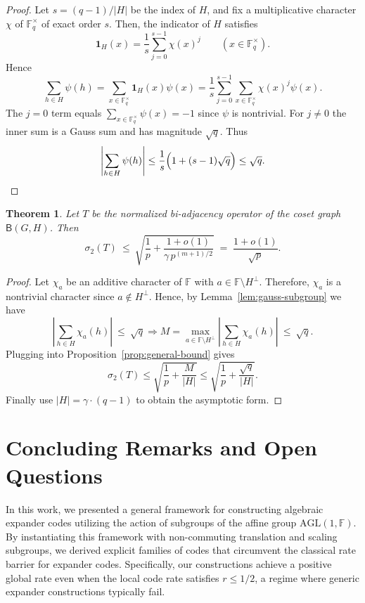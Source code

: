 \documentclass[11pt]{article}
\theoremstyle{plain}
\newtheorem{theorem}{Theorem}[section]
\theoremstyle{definition}
\begin{document}
\begin{proof}
Let   $s=(q-1)/|H|$ be the index of $H$, and fix a multiplicative character $\chi$ of $\mathbb F_q^\times$ of exact order $s$.
Then, the indicator of $H$ satisfies
\[
\mathbf{1}_H(x) = \frac1s\sum_{j=0}^{s-1}\chi(x)^j \qquad (x\in\mathbb F_q^\times).
\]
Hence
\[
\sum_{h\in H}\psi(h)
=\sum_{x\in\mathbb F_q^\times}\mathbf{1}_H(x)\psi(x)
=\frac1s\sum_{j=0}^{s-1}\sum_{x\in\mathbb F_q^\times}\chi(x)^j\psi(x).
\]
The $j=0$ term equals $\sum_{x\in\mathbb F_q^\times}\psi(x)=-1$ since $\psi$ is nontrivial.
For $j\ne 0$ the inner sum is a Gauss sum and has magnitude $\sqrt{q}$.
Thus
\[
\left|\sum_{h\in H}\psi(h)\right|
\le \frac1s\Bigl(1+(s-1)\sqrt{q}\Bigr)\le \sqrt{q}.
\]
\end{proof}

\begin{theorem}
\label{thm:spectral-bound-second}
Let $T$ be the normalized bi-adjacency operator of the coset graph $\mathsf{B}(G,H)$.
Then
\[
\sigma_2(T)\ \le\ \sqrt{\frac1p+\frac{1+o(1)}{\gamma\, p^{(m+1)/2}}}\;=\;\frac{1+o(1)}{\sqrt{p}}.
\]
\end{theorem}

\begin{proof}
Let  $\chi_a$ be an additive character of $\mathbb{F}$ with $a\in \mathbb{F}\setminus H^\perp$. Therefore, $\chi_a$  is a nontrivial character since $a\notin H^\perp$. Hence, by Lemma~\ref{lem:gauss-subgroup} we have
\[
\left|\sum_{h\in H}\chi_a(h)\right|\ \le\ \sqrt{q}\Rightarrow M=\max_{a\in \mathbb{F}\setminus H^\perp}\left|\sum_{h\in H}\chi_a(h)\right|\ \le\ \sqrt{q}.
\]
Plugging into Proposition~\ref{prop:general-bound} gives
\[
\sigma_2(T)\le \sqrt{\frac1p+\frac{M}{|H|}} \le \sqrt{\frac1p+\frac{\sqrt{q}}{|H|}}.
\]
Finally use $|H|=\gamma\cdot (q-1)$  to obtain the asymptotic form.
\end{proof}


\section{Concluding Remarks and Open Questions}
\label{sec:conclusion}
In this work, we presented a general framework for constructing algebraic expander codes utilizing the action of subgroups of the affine group $\mathrm{AGL}(1, \mathbb{F})$. By instantiating this framework with non-commuting translation and scaling subgroups, we derived explicit families of codes that circumvent the classical rate barrier for expander codes. Specifically, our constructions achieve a positive global rate even when the local code rate satisfies $r \le 1/2$, a regime where generic expander constructions typically fail.
\end{document}
